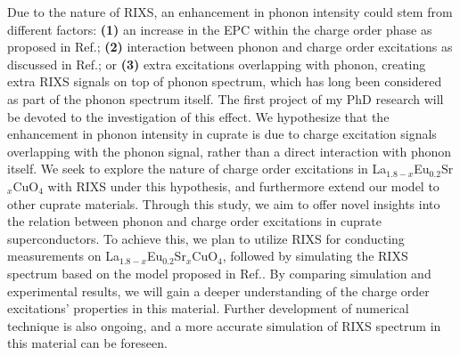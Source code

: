 \documentclass[11pt]{article}
\begin{document}
Due to the nature of RIXS, an enhancement in phonon intensity could stem from different factors:
\textbf{(1)} an increase in the EPC within the charge order phase as proposed in Ref.\cite{wang_charge_2021,peng_electronic_2022};
\textbf{(2)} interaction between phonon and charge order excitations as discussed in Ref.\cite{li_multiorbital_2020, chaix_dispersive_2017,huang_quantum_2021}; 
or \textbf{(3)} extra excitations overlapping with phonon, creating extra RIXS signals on top of phonon spectrum, which has long been considered as part of the phonon spectrum itself. 
The first project of my PhD research will be devoted to the investigation of this effect.
We hypothesize that the enhancement in phonon intensity in cuprate is due to charge excitation signals overlapping with the phonon signal, rather than a direct interaction with phonon itself.  
We seek to explore the nature of charge order excitations in {La$_{1.8-x}$Eu$_{0.2}$Sr$_x$CuO$_{4}$} with RIXS under this hypothesis, and furthermore extend our model to other cuprate materials. 
Through this study, we aim to offer novel insights into the relation between phonon and charge order excitations in cuprate superconductors. 
To achieve this, we plan to utilize RIXS for conducting measurements on {La$_{1.8-x}$Eu$_{0.2}$Sr$_x$CuO$_{4}$}, followed by simulating the RIXS spectrum based on the model proposed in Ref.\cite{devereaux_directly_2016}. 
By comparing simulation and experimental results, we will gain a deeper understanding of the charge order excitations' properties in this material. 
Further development of numerical technique is also ongoing, and a more accurate simulation of RIXS spectrum in this material can be foreseen.
\end{document}
